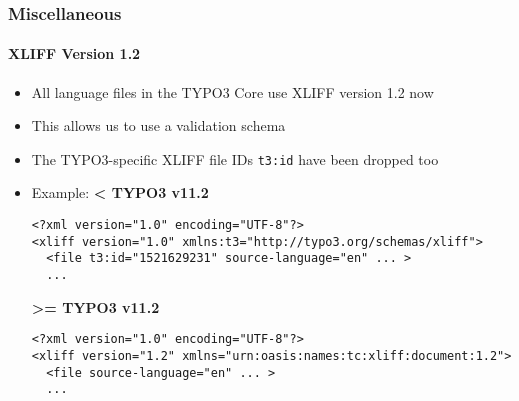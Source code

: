 %

\begin{frame}[fragile]
	\frametitle{Miscellaneous}
	\framesubtitle{XLIFF Version 1.2}


	\begin{itemize}
		\item All language files in the TYPO3 Core use XLIFF version 1.2 now
		\item This allows us to use a validation schema
		\item The TYPO3-specific XLIFF file IDs \texttt{t3:id} have been dropped too
		\item Example:\newline
\smaller\textbf{< TYPO3 v11.2}\normalsize
\begin{lstlisting}
<?xml version="1.0" encoding="UTF-8"?>
<xliff version="1.0" xmlns:t3="http://typo3.org/schemas/xliff">
  <file t3:id="1521629231" source-language="en" ... >
  ...
\end{lstlisting}
\smaller\textbf{>= TYPO3 v11.2}\normalsize
\begin{lstlisting}
<?xml version="1.0" encoding="UTF-8"?>
<xliff version="1.2" xmlns="urn:oasis:names:tc:xliff:document:1.2">
  <file source-language="en" ... >
  ...
\end{lstlisting}

	\end{itemize}

\end{frame}

